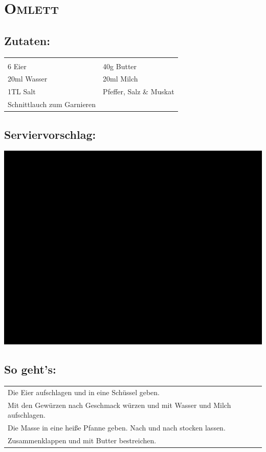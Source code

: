 \section{\textsc{Omlett}}

\subsection*{Zutaten:}

\begin{tabular}{p{7.5cm} p{7.5cm}}
	& \\
	6 Eier & 40g Butter \\
	20ml Wasser & 20ml Milch \\
  1TL Salt & Pfeffer, Salz \& Muskat \\
  Schnittlauch zum Garnieren &
\end{tabular}

\subsection*{Serviervorschlag:}

\includegraphics[width=\textwidth]{img/ph.jpg} \cite{omlett}

\subsection*{So geht's:}

\begin{tabular}{p{15cm}}
	\\
  Die Eier aufschlagen und in eine Schüssel geben.\\
  Mit den Gewürzen nach Geschmack würzen und mit Wasser und Milch aufschlagen. \\
  Die Masse in eine heiße Pfanne geben. Nach und nach stocken lassen.\\
  Zusammenklappen und mit Butter bestreichen. 
\end{tabular}
